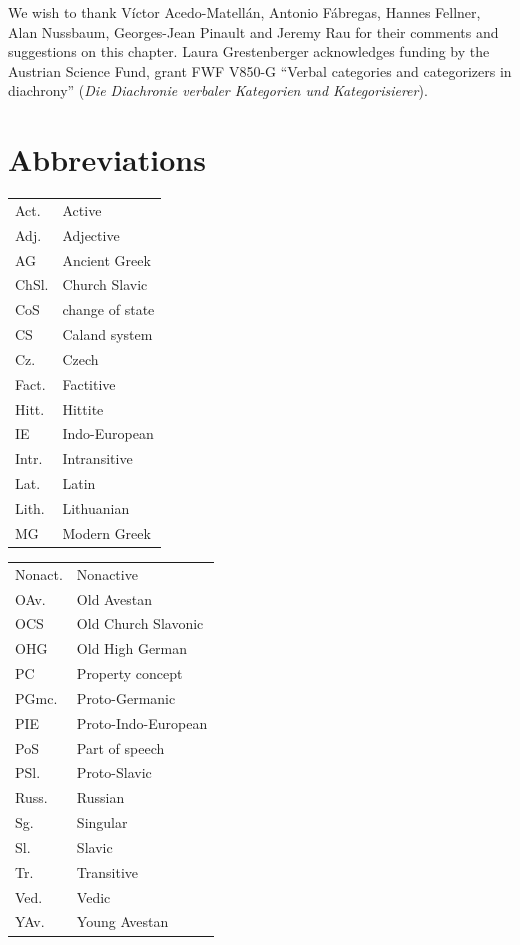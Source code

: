 \documentclass[output=paper,colorlinks,citecolor=brown]{langscibook}
\begin{document}
We wish to thank  Víctor Acedo-Matellán, Antonio Fábregas, Hannes Fellner, Alan Nussbaum, Georges-Jean Pinault and Jeremy Rau for their comments and suggestions on this chapter.  Laura Grestenberger acknowledges funding by the Austrian Science Fund, grant FWF V850-G ``Verbal categories and categorizers in diachrony'' (\textit{Die Diachronie verbaler Kategorien und Kategorisierer}). 

\section*{Abbreviations}
\begin{tabularx}{.5\textwidth}{@{}lQ@{}}
Act. & Active\\
Adj. & Adjective\\
AG & Ancient Greek\\
ChSl. & Church Slavic\\
CoS & change of state\\
CS & Caland system\\
Cz. & Czech\\
Fact. & Factitive\\
Hitt. & Hittite\\
IE & Indo-European\\
Intr. & Intransitive\\
Lat. & Latin\\
Lith. & Lithuanian\\
MG & Modern Greek\\
\end{tabularx}%
\begin{tabularx}{.5\textwidth}{@{}lQ@{}}
Nonact. & Nonactive\\
OAv. & Old Avestan\\
OCS & Old Church Slavonic\\
OHG & Old High German\\
PC & Property concept\\
PGmc. & Proto-Germanic\\
PIE & Proto-Indo-European\\
PoS & Part of speech\\
PSl. & Proto-Slavic\\
Russ. & Russian\\
Sg. & Singular\\
Sl. & Slavic\\
Tr. & Transitive\\
Ved. & Vedic\\
YAv. & Young Avestan\\
\end{tabularx}





\sloppy
\printbibliography[heading=subbibliography,notkeyword=this]
\end{document}
